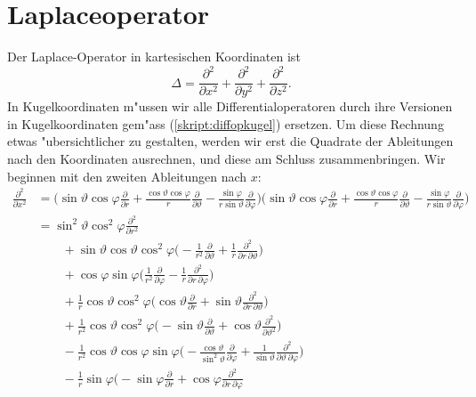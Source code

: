 \section{Laplaceoperator}
Der Laplace-Operator in kartesischen Koordinaten ist
\[
\Delta
=
\frac{\partial^2}{\partial x^2}
+
\frac{\partial^2}{\partial y^2}
+
\frac{\partial^2}{\partial z^2}.
\]
In Kugelkoordinaten m"ussen wir alle Differentialoperatoren durch
ihre Versionen in Kugelkoordinaten gem"ass (\ref{skript:diffopkugel}) 
ersetzen.
Um diese Rechnung etwas "ubersichtlicher zu gestalten, werden wir erst
die Quadrate der Ableitungen nach den Koordinaten ausrechnen, und diese
am Schluss zusammenbringen.
Wir beginnen mit den zweiten Ableitungen nach $x$:
\begin{align*}
\frac{\partial^2}{\partial x^2}
&=
\biggl(
\sin\vartheta\cos\varphi
\frac{\partial}{\partial r}
+
\frac{\cos\vartheta\cos\varphi}{r}
\frac{\partial}{\partial\vartheta}
-
\frac{\sin\varphi}{r\sin\vartheta}
\frac{\partial}{\partial\varphi}
\biggr)
\biggl(
\sin\vartheta\cos\varphi
\frac{\partial}{\partial r}
+
\frac{\cos\vartheta\cos\varphi}{r}
\frac{\partial}{\partial\vartheta}
-
\frac{\sin\varphi}{r\sin\vartheta}
\frac{\partial}{\partial\varphi}
\biggr)
\\
&=
\sin^2\vartheta\cos^2\varphi\frac{\partial^2}{\partial r^2}
\\
&\qquad
+
\sin\vartheta \cos\vartheta \cos^2\varphi
\biggl(
-\frac1{r^2}
\frac{\partial}{\partial\vartheta}
+\frac1{r}
\frac{\partial^2}{\partial r\,\partial\vartheta}
\biggr)
\\
&\qquad
+
\cos\varphi\sin\varphi\biggl(
\frac1{r^2}\frac{\partial}{\partial\varphi}
-\frac1{r}\frac{\partial^2}{\partial r\,\partial\varphi}
\biggr)
\\
&\qquad
+\frac1{r}
\cos\vartheta\cos^2\varphi
\biggl(
\cos\vartheta\frac{\partial}{\partial r}
+
\sin\vartheta \frac{\partial^2}{\partial r\,\partial\vartheta}
\biggr)
\\
&\qquad
+\frac1{r^2}
\cos\vartheta\cos^2\varphi\biggl(
-\sin\vartheta
\frac{\partial}{\partial\vartheta}
+
\cos\vartheta
\frac{\partial^2}{\partial\vartheta^2}
\biggr)
\\
&\qquad
-\frac1{r^2}
\cos\vartheta\cos\varphi\sin\varphi
\biggl(
-\frac{\cos\vartheta}{\sin^2\vartheta}
\frac{\partial}{\partial\varphi}
+\frac1{\sin\vartheta}
\frac{\partial^2}{\partial\vartheta\,\partial\varphi}
\biggr)
\\
&\qquad
-\frac1r\sin\varphi\biggl(
-\sin\varphi \frac{\partial}{\partial r}
+\cos\varphi \frac{\partial^2}{\partial r\,\partial\varphi}

\end{align*}
